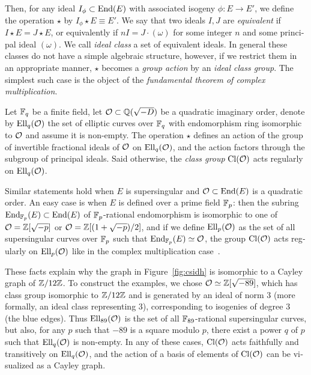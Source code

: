 \begin{otherlanguage}{english}
  Then, for any ideal $I_\phi\subset\mathrm{End}(E)$ with associated isogeny
  $\phi:E\to E'$, we define the operation $\star$ by
  $I_\phi\star E \equiv E'$. We say that two ideals $I,J$ are
  \emph{equivalent} if $I\star E=J\star E$, or equivalently if
  $nI=J\cdot(\omega)$ for some integer $n$ and some principal ideal
  $(\omega)$. We call \emph{ideal class} a set of equivalent
  ideals. In general these classes do not have a simple algebraic
  structure, however, if we restrict them in an appropriate manner,
  $\star$ becomes a \emph{group action} by an \emph{ideal class
    group}. The simplest such case is the object of the
  \emph{fundamental theorem of complex multiplication}.

  \begin{theorem}
    \label{th:cm}
    Let $\mathbb{F}_q$ be a finite field, let $\mathcal{O}\subset\mathbb{Q}(\sqrt{-D})$ be a
    quadratic imaginary order, denote by $\mathrm{Ell}_q(\mathcal{O})$ the set of
    elliptic curves over $\mathbb{F}_q$ with endomorphism ring isomorphic to
    $\mathcal{O}$ and assume it is non-empty. The operation $\star$ defines an
    action of the group of invertible fractional ideals of $\mathcal{O}$ on
    $\mathrm{Ell}_q(\mathcal{O})$, and the action factors through the subgroup of
    principal ideals. Said otherwise, the \emph{class group} $\mathrm{Cl}(\mathcal{O})$
    acts regularly on $\mathrm{Ell}_q(\mathcal{O})$.
  \end{theorem}

  Similar statements hold when $E$ is supersingular and
  $\mathcal{O}\subset\mathrm{End}(E)$ is a quadratic order. An easy case is when $E$ is
  defined over a prime field $\mathbb{F}_p$: then the subring
  $\mathrm{End}_{\mathbb{F}_p}(E)\subset\mathrm{End}(E)$ of $\mathbb{F}_p$-rational endomorphism is
  isomorphic to one of $\mathcal{O}=\mathbb{Z}[\sqrt{-p}]$ or $\mathcal{O}=\mathbb{Z}[(1+\sqrt{-p})/2]$,
  and if we define $\mathrm{Ell}_p(\mathcal{O})$ as the set of all supersingular curves
  over $\mathbb{F}_p$ such that $\mathrm{End}_{\mathbb{F}_p}(E)\simeq\mathcal{O}$, the group $\mathrm{Cl}(\mathcal{O})$
  acts regularly on $\mathrm{Ell}_p(\mathcal{O})$ like in the complex multiplication
  case~\cite{Delfs2016}.

  These facts explain why the graph in Figure~\ref{fig:csidh} is
  isomorphic to a Cayley graph of $\mathbb{Z}/12\mathbb{Z}$. To construct the
  examples, we chose $\mathcal{O}\simeq\mathbb{Z}[\sqrt{-89}]$, which has class group
  isomorphic to $\mathbb{Z}/12\mathbb{Z}$ and is generated by an ideal of norm $3$
  (more formally, an ideal class representing $3$), corresponding to
  isogenies of degree $3$ (the blue edges). Thus $\mathrm{Ell}_{89}(\mathcal{O})$ is
  the set of all $\mathbb{F}_{89}$-rational supersingular curves, but also,
  for any $p$ such that $-89$ is a square modulo $p$, there exist a
  power $q$ of $p$ such that $\mathrm{Ell}_q(\mathcal{O})$ is non-empty. In any of
  these cases, $\mathrm{Cl}(\mathcal{O})$ acts faithfully and transitively on
  $\mathrm{Ell}_q(\mathcal{O})$, and the action of a basis of elements of $\mathrm{Cl}(\mathcal{O})$ can
  be visualized as a Cayley graph.


\end{otherlanguage}
